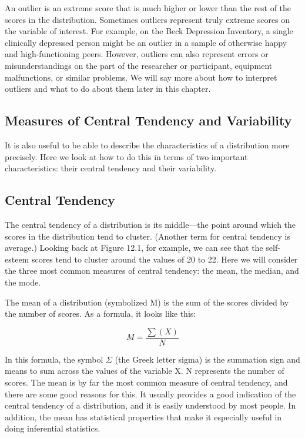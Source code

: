 An outlier is an extreme score that is much higher or lower than the rest of the scores in the distribution. Sometimes outliers represent truly extreme scores on the variable of interest. For example, on the Beck Depression Inventory, a single clinically depressed person might be an outlier in a sample of otherwise happy and high-functioning peers. However, outliers can also represent errors or misunderstandings on the part of the researcher or participant, equipment malfunctions, or similar problems. We will say more about how to interpret outliers and what to do about them later in this chapter.



\subsection{Measures of Central Tendency and Variability}

It is also useful to be able to describe the characteristics of a distribution more precisely. Here we look at how to do this in terms of two important characteristics: their central tendency and their variability.



\subsection{Central Tendency}

The central tendency of a distribution is its middle---the point around which the scores in the distribution tend to cluster. (Another term for central tendency is average.) Looking back at Figure 12.1, for example, we can see that the self-esteem scores tend to cluster around the values of 20 to 22. Here we will consider the three most common measures of central tendency: the mean, the median, and the mode.


The mean of a distribution (symbolized M) is the sum of the scores divided by the number of scores. As a formula, it looks like this:


\begin{equation}
M = \frac{\sum(X)}{N}
\end{equation}

In this formula, the symbol $Σ$ (the Greek letter sigma) is the summation sign and means to sum across the
values of the variable X. N represents the number of scores. The mean is by far the most common measure of central tendency, and there are some good reasons for this. It usually provides a good indication of the central tendency of a distribution, and it is easily understood by most people. In addition, the mean has statistical properties that make it especially useful in doing inferential statistics.


